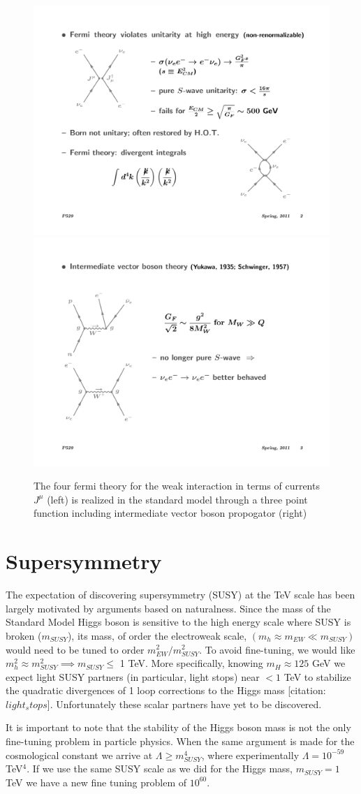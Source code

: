 \begin{figure}
\begin{center}
\includegraphics[width=.25\textwidth]{pics/fermi_theory}
\includegraphics[width=.35\textwidth]{pics/int_vec_boson}
\end{center}
\caption{The four fermi theory for the weak interaction in terms of currents $J^\mu$ (left) is realized in the standard model through a three point function including intermediate vector boson propogator (right)}
\label{fig:int_vec_boson}
\end{figure}


\section{Supersymmetry}

The expectation of discovering supersymmetry (SUSY) at the TeV scale has been largely motivated
 by arguments based on naturalness. 
Since the mass of the Standard Model Higgs boson is sensitive to the high energy scale where SUSY
 is broken ($m_{SUSY}$), its mass, of order the electroweak scale, $(m_h \approx m_{EW} \ll m_{SUSY})$
 would need to be tuned to order $m_{EW}^2/m_{SUSY}^2$. 
To avoid fine-tuning, we would like  $m_h^2 \approx m_{SUSY}^2 \implies m_{SUSY} \leq$ 1 TeV. 
More specifically, knowing $m_H \approx 125$ GeV we expect light SUSY partners (in particular, light stops)
 near $< 1$ TeV to stabilize the quadratic divergences of 1 loop corrections to the Higgs mass
 [citation:$light_stops$]. 
Unfortunately these scalar partners have yet to be discovered.

It is important to note that the stability of the Higgs boson mass is not the only
 fine-tuning problem in particle physics. 
When the same argument is made for the cosmological constant we arrive at $\Lambda \geq m_{SUSY}^4$, 
where experimentally $\Lambda = 10^{-59}$ TeV$^4$.   
If we use the same SUSY scale as we did for the Higgs mass,
 $m_{SUSY} = 1$ TeV we have a new fine tuning problem of $10^{60}$.


